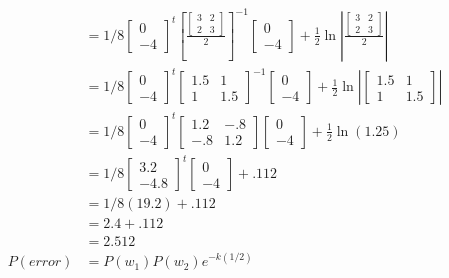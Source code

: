\documentclass[12pt]{article}
\begin{document}
\begin{enumerate}
\begin{enumerate}
\begin{equation}
\begin{split}
      & = 1/8[\begin{array}{c}0\\-4\end{array}]^t\left[\frac{[\begin{array}{cc}3&2\\2&3\end{array}]}{2}\right]^{-1}[\begin{array}{c}0\\-4\end{array}]+\frac{1}{2} \ln|\frac{[\begin{array}{cc}3&2\\2&3\end{array}]}{2}| \\
      & = 1/8[\begin{array}{c}0\\-4\end{array}]^t[\begin{array}{cc}1.5&1\\1&1.5\end{array}]^{-1}[\begin{array}{c}0\\-4\end{array}]+\frac{1}{2} \ln|[\begin{array}{cc}1.5&1\\1&1.5\end{array}]| \\
      & = 1/8[\begin{array}{c}0\\-4\end{array}]^t[\begin{array}{cc}1.2&-.8\\-.8&1.2\end{array}][\begin{array}{c}0\\-4\end{array}]+\frac{1}{2} \ln(1.25) \\
      & = 1/8[\begin{array}{c}3.2\\-4.8\end{array}]^t[\begin{array}{c}0\\-4\end{array}]+.112 \\
      & = 1/8(19.2)+.112 \\
      & = 2.4 + .112 \\
      & = 2.512 \\
      P(error)& = P(w_1)P(w_2)e^{-k(1/2)} \\

\end{split}
\end{equation}
\end{enumerate}
\end{enumerate}
\end{document}
